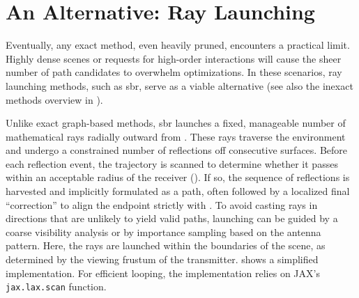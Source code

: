 \section{An Alternative: Ray Launching}

Eventually, any exact method, even heavily pruned, encounters a practical limit. Highly dense scenes or requests for high-order interactions will cause the sheer number of path candidates to overwhelm optimizations. In these scenarios, ray launching methods, such as \gls{sbr}, serve as a viable alternative (see also the inexact methods overview in ).

Unlike exact graph-based methods, \gls{sbr} launches a fixed, manageable number of mathematical rays radially outward from . These rays traverse the environment and undergo a constrained number of reflections off consecutive surfaces. Before each reflection event, the trajectory is scanned to determine whether it passes within an acceptable radius of the receiver (). If so, the sequence of reflections is harvested and implicitly formulated as a path, often followed by a localized final \enquote{correction} to align the endpoint strictly with . To avoid casting rays in directions that are unlikely to yield valid paths, launching can be guided by a coarse visibility analysis or by importance sampling based on the antenna pattern. Here, the rays are launched within the boundaries of the scene, as determined by the viewing frustum of the transmitter.  shows a simplified implementation. For efficient looping, the implementation relies on JAX's \texttt{jax.lax.scan} function.

\begin{listing*}
  \ContinuedFloat*
  \caption{Simplified \gls{sbr} implementation: setup and ray launch parameters.}
\end{listing*}

\begin{listing*}
  \ContinuedFloat
  \caption{Simplified \gls{sbr} implementation (continued): computing the next bounce (scan function).}
\end{listing*}

\begin{listing*}
  \ContinuedFloat
  \caption{Simplified \gls{sbr} implementation (continued): detecting intersections with reception sphere (scan function).}
\end{listing*}

